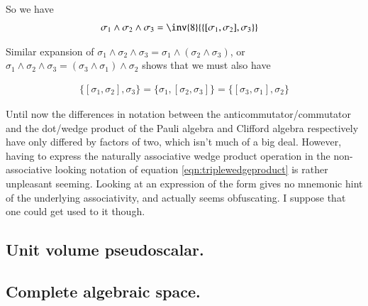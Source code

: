 \documentclass{article}
\newcommand{\symmetric}[2]{{\{{#1},{#2}\}}}
\newcommand{\antisymmetric}[2]{[{#1},{#2}]}
\begin{document}
So we have
\begin{align}\label{eqn:triplewedgeproduct}
\sigma_1 \wedge \sigma_2 \wedge \sigma_3 
&= \inv{8} \symmetric{\antisymmetric{\sigma_1}{\sigma_2}}{\sigma_3}
\end{align}

Similar expansion of $\sigma_1 \wedge \sigma_2 \wedge \sigma_3 = \sigma_1 \wedge (\sigma_2 \wedge \sigma_3)$, or
$\sigma_1 \wedge \sigma_2 \wedge \sigma_3 = (\sigma_3 \wedge \sigma_1) \wedge \sigma_2$
 shows that we must also have

\begin{align}
\symmetric{\antisymmetric{\sigma_1}{\sigma_2}}{\sigma_3}
= \symmetric{\sigma_1}{\antisymmetric{\sigma_2}{\sigma_3}}
= \symmetric{\antisymmetric{\sigma_3}{\sigma_1}}{\sigma_2}
\end{align}

Until now the differences in notation between the anticommutator/commutator and the dot/wedge product of the Pauli algebra and Clifford algebra respectively have only differed by factors of two, which isn't much of a big deal.  However, having to express the naturally associative wedge product operation in the non-associative looking notation of equation \ref{eqn:triplewedgeproduct} is rather unpleasant seeming.  Looking at an expression of the form gives no mnemonic
hint of the underlying associativity, and actually seems obfuscating.  I suppose that one could get used to it though.

\subsection{ Unit volume pseudoscalar. }

\subsection{ Complete algebraic space. }




\end{document}
